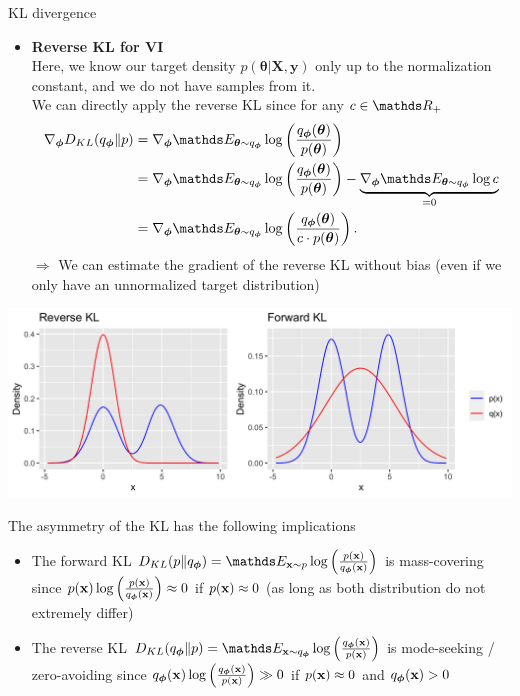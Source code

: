 \documentclass[11pt,compress,t,notes=noshow, xcolor=table]{beamer}
\begin{document}
\begin{vbframe}{KL divergence}
\begin{itemize}
\end{itemize}
 \framebreak

 \begin{itemize}
     \item \textbf{Reverse KL for VI} \\
     Here, we know our target density $p(\bm{\theta}\vert \mathbf{X}, \mathbf{y})$ only up to the normalization constant, and we do not have samples from it. \\
     \lz
     We can directly apply the reverse KL since for any $c\in \R_+$
     \begin{align*}
         \nabla_{\bm{\phi}} D_{KL}(q_{\bm{\phi}}\|p) &= \nabla_{\bm{\phi}} \E_{\bm{\theta} \sim q_{\bm{\phi}}}\log\left(\frac{q_{\bm{\phi}}(\bm{\theta})}{p(\bm{\theta})}\right) \\
         &= \nabla_{\bm{\phi}} \E_{\bm{\theta} \sim q_{\bm{\phi}}}\log\left(\frac{q_{\bm{\phi}}(\bm{\theta})}{p(\bm{\theta})}\right) - \underbrace{\nabla_{\bm{\phi}} \E_{\bm{\theta} \sim q_{\bm{\phi}}}\log c}_{=0}\\
         &= \nabla_{\bm{\phi}} \E_{\bm{\theta} \sim q_{\bm{\phi}}}\log\left(\frac{q_{\bm{\phi}}(\bm{\theta})}{c\cdot p(\bm{\theta})}\right).
     \end{align*}
     $\Rightarrow$ We can estimate the gradient of the reverse KL without bias (even if we only have an unnormalized target distribution)
 \end{itemize}
 \framebreak
 
\begin{center}
\includegraphics[width=0.7\linewidth]{figure/kl_fitting_plot.png}
\end{center}

The asymmetry of the KL has the following implications
\begin{itemize}
    \item The forward KL $D_{KL}(p\|q_{\bm{\phi}}) = \E_{\xv \sim p} \log\left(\frac{p(\xv)}{q_{\bm{\phi}}(\xv)}\right)$ is mass-covering since $p(\mathbf{x})\log\left(\frac{p(\mathbf{x})}{q_{\bm{\phi}}(\mathbf{x})}\right) \approx 0$ if $p(\mathbf{x}) \approx 0$ (as long as both distribution do not extremely differ)
        \item The reverse KL $D_{KL}(q_{\bm{\phi}}\|p) = \E_{\xv \sim q_{\bm{\phi}}} \log\left(\frac{q_{\bm{\phi}}(\xv)}{p(\xv)}\right)$ is mode-seeking / zero-avoiding since $q_{\bm{\phi}}(\mathbf{x})\log\left(\frac{q_{\bm{\phi}}(\mathbf{x})}{p(\mathbf{x})}\right) \gg 0$ if $p(\mathbf{x}) \approx 0$ and $q_{\bm{\phi}}(\mathbf{x}) > 0$ 
\end{itemize}
 
\end{vbframe}

\endlecture
\end{document}
